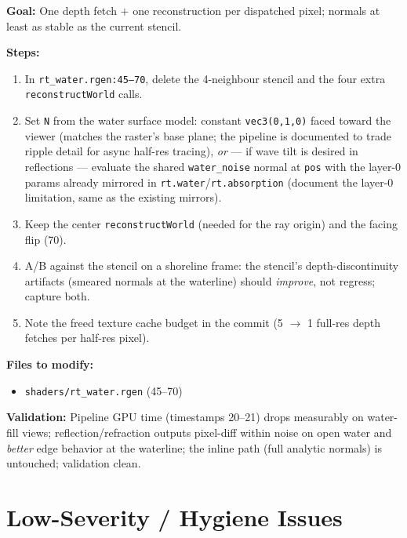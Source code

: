 \documentclass[11pt,a4paper]{article}
\begin{document}
\begin{tcolorbox}[promptbox={Prompt: Replace the Raygen Depth Stencil with an Analytic Water Normal}]
\textbf{Goal:} One depth fetch $+$ one reconstruction per dispatched pixel; normals at least as stable as the current stencil.

\textbf{Steps:}
\begin{enumerate}
    \item In \texttt{rt\_water.rgen:45--70}, delete the 4-neighbour stencil and the four extra \texttt{reconstructWorld} calls.
    \item Set \texttt{N} from the water surface model: constant \texttt{vec3(0,1,0)} faced toward the viewer (matches the raster's base plane; the pipeline is documented to trade ripple detail for async half-res tracing), \emph{or} --- if wave tilt is desired in reflections --- evaluate the shared \texttt{water\_noise} normal at \texttt{pos} with the layer-0 params already mirrored in \texttt{rt.water}/\texttt{rt.absorption} (document the layer-0 limitation, same as the existing mirrors).
    \item Keep the center \texttt{reconstructWorld} (needed for the ray origin) and the facing flip (70).
    \item A/B against the stencil on a shoreline frame: the stencil's depth-discontinuity artifacts (smeared normals at the waterline) should \emph{improve}, not regress; capture both.
    \item Note the freed texture cache budget in the commit (5 $\rightarrow$ 1 full-res depth fetches per half-res pixel).
\end{enumerate}

\textbf{Files to modify:}
\begin{itemize}
    \item \texttt{shaders/rt\_water.rgen} (45--70)
\end{itemize}

\textbf{Validation:} Pipeline GPU time (timestamps 20--21) drops measurably on water-fill views; reflection/refraction outputs pixel-diff within noise on open water and \emph{better} edge behavior at the waterline; the inline path (full analytic normals) is untouched; validation clean.
\end{tcolorbox}

\section{Low-Severity / Hygiene Issues}
\end{document}
